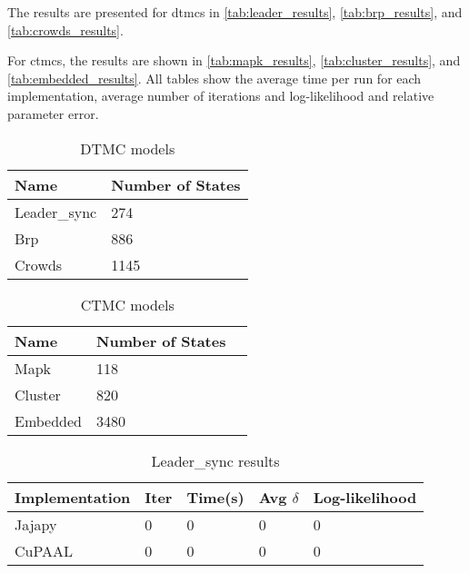 The results are presented for \glspl{dtmc} in \autoref{tab:leader_results}, \autoref{tab:brp_results}, and \autoref{tab:crowds_results}.

For \glspl{ctmc}, the results are shown in \autoref{tab:mapk_results}, \autoref{tab:cluster_results}, and \autoref{tab:embedded_results}.
All tables show the average time per run for each implementation, average number of iterations and log-likelihood and relative parameter error.

\begin{table}[!htb]
    \centering
    \caption{DTMC models}
    \label{tab:dtmc_models}
    \begin{tabular}{ll}
        \toprule
        Name         & Number of States \\
        \midrule
        Leader\_sync & 274              \\
        Brp          & 886              \\
        Crowds       & 1145             \\
        \bottomrule
    \end{tabular}
\end{table}

\begin{table}[!htb]
    \centering
    \caption{CTMC models}
    \label{tab:ctmc_models}
    \begin{tabular}{lll}
        \toprule
        Name     & Number of States \\
        \midrule
        Mapk     & 118              \\
        Cluster  & 820              \\
        Embedded & 3480             \\
        \bottomrule
    \end{tabular}
\end{table}


\begin{table}[!htb]
    \centering
    \caption{Leader\_sync results}
    \label{tab:leader_results}
    \begin{tabular}{lllll}
        \toprule
        Implementation & Iter & Time(s) & Avg $\delta$ & Log-likelihood \\
        \midrule
        Jajapy         & 0    & 0       & 0            & 0              \\
        CuPAAL         & 0    & 0       & 0            & 0              \\
        \bottomrule
    \end{tabular}
\end{table}

